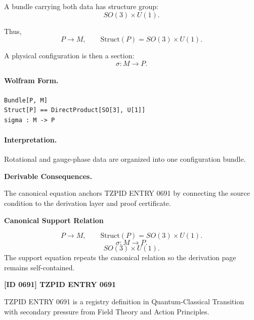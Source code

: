 A bundle carrying both data has structure group:
\begin{equation}
SO(3)\times U(1).
\end{equation}

Thus,
\begin{equation}
P\to M,
\qquad
\mathrm{Struct}(P)=SO(3)\times U(1).
\end{equation}

A physical configuration is then a section:
\begin{equation}
\boxed{
\sigma:M\to P.
}
\end{equation}

\paragraph{Wolfram Form.}
\begin{verbatim}
Bundle[P, M]
Struct[P] == DirectProduct[SO[3], U[1]]
sigma : M -> P
\end{verbatim}

\paragraph{Interpretation.}
Rotational and gauge-phase data are organized into one configuration bundle.
\endgroup

\par\vspace{0.35em}
\noindent\textbf{Derivable Consequences.}\quad
\begingroup
\footnotesize
\raggedright
The canonical equation anchors TZPID ENTRY 0691 by connecting the source condition to the derivation layer and proof certificate.
\par\endgroup

\noindent\textbf{Canonical Support Relation}\par
\[
P \longrightarrow M, \qquad \mathrm{Struct}(P)=SO(3)\times U(1).
\]
\[
\sigma:M\longrightarrow P.
\]
\[
SO(3)\times U(1).
\]
\noindent The support equation repeats the canonical relation so the derivation page remains self-contained.\par

\clearpage
\noindent\textbf{[ID 0691] TZPID ENTRY 0691}\par
\vspace{0.35em}
\begingroup\small
{}
TZPID ENTRY 0691 is a registry definition in Quantum-Classical Transition with secondary pressure from Field Theory and Action Principles.


